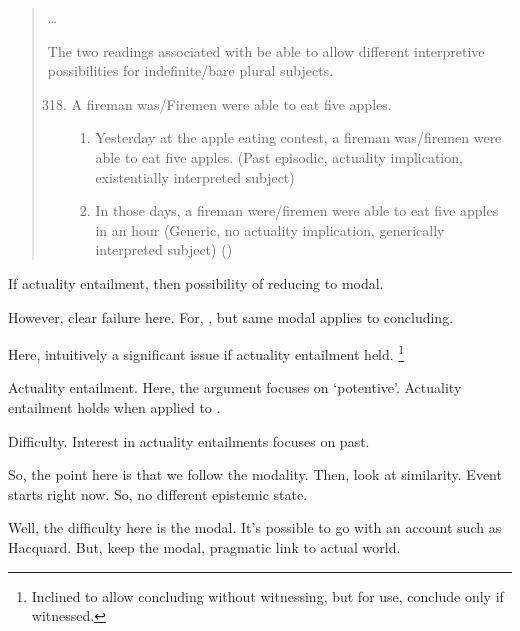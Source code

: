 \begin{note}
\begin{quote}
    \dots

    The two readings associated with be able to allow different interpretive possibilities for indefinite/bare plural subjects.

    \begin{enumerate}[label=(\arabic*), ref=(\arabic*)]
      \setcounter{enumi}{317}
    \item
      A fireman was/Firemen were able to eat five apples.
      \begin{enumerate}[label=\alph*., ref=\alph*.]
      \item
        Yesterday at the apple eating contest, a fireman was/firemen were able to eat five apples.
        (Past episodic, actuality implication, existentially interpreted subject)
      \item
        In those days, a fireman were/firemen were able to eat five apples in an hour (Generic, no actuality implication, generically interpreted subject)%
        \mbox{}\hfill\mbox{(\citeauthor[172--173]{Bhatt:1999wq})}
      \end{enumerate}
    \end{enumerate}
  \end{quote}

  If actuality entailment, then possibility of reducing to modal.

  However, clear failure here.
  For, \support{}, but same modal applies to concluding.

  Here, intuitively a significant issue if actuality entailment held.%
  \footnote{
    Inclined to allow concluding without witnessing, but for use, conclude only if witnessed.
  }
\end{note}

\begin{note}
  \begin{argument}
    Actuality entailment.
    Here, the argument focuses on `potentive'.
    Actuality entailment holds when applied to \support{}.

    Difficulty.
    Interest in actuality entailments focuses on past.
  \end{argument}
\end{note}

\begin{note}
  So, the point here is that we follow the modality.
  Then, look at similarity.
  Event starts right now.
  So, no different epistemic state.

  Well, the difficulty here is the modal.
  It's possible to go with an account such as Hacquard.
  But, keep the modal, pragmatic link to actual world.
\end{note}

